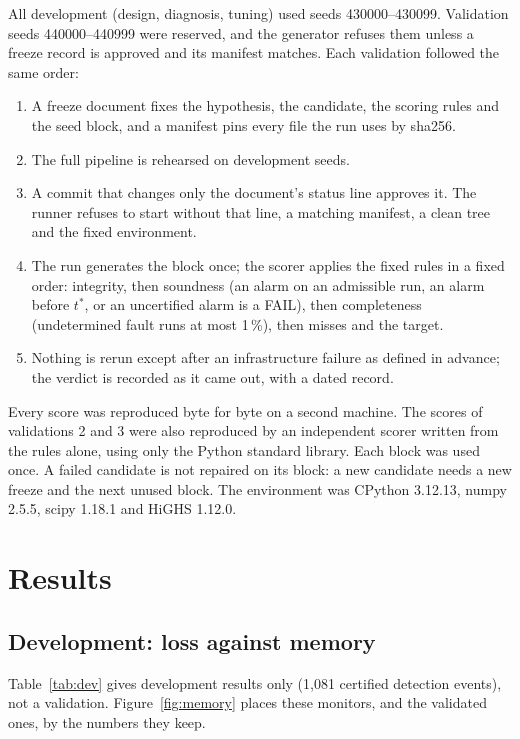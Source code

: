 \documentclass[11pt,a4paper]{article}
\newcommand{\tstar}{t^{\ast}}
\begin{document}
All development (design, diagnosis, tuning) used seeds 430000--430099. Validation seeds 440000--440999 were reserved,
and the generator refuses them unless a freeze record is approved and its manifest matches. Each validation followed
the same order:
\begin{enumerate}
\item A freeze document fixes the hypothesis, the candidate, the scoring rules and the seed block, and a manifest pins
  every file the run uses by sha256.
\item The full pipeline is rehearsed on development seeds.
\item A commit that changes only the document's status line approves it. The runner refuses to start without that
  line, a matching manifest, a clean tree and the fixed environment.
\item The run generates the block once; the scorer applies the fixed rules in a fixed order: integrity, then soundness
  (an alarm on an admissible run, an alarm before $\tstar$, or an uncertified alarm is a FAIL), then completeness
  (undetermined fault runs at most 1\,\%), then misses and the target.
\item Nothing is rerun except after an infrastructure failure as defined in advance; the verdict is recorded as it
  came out, with a dated record.
\end{enumerate}
Every score was reproduced byte for byte on a second machine. The scores of validations 2 and 3 were also reproduced by
an independent scorer written from the rules alone, using only the Python standard library. Each block was used once. A failed candidate is not repaired on its
block: a new candidate needs a new freeze and the next unused block. The environment was CPython 3.12.13, numpy 2.5.5,
scipy 1.18.1 and HiGHS 1.12.0.

\section{Results}

\subsection{Development: loss against memory}

Table~\ref{tab:dev} gives development results only (1,081 certified detection events), not a validation. Figure~\ref{fig:memory} places these monitors, and the validated ones, by the numbers they keep.
\end{document}

